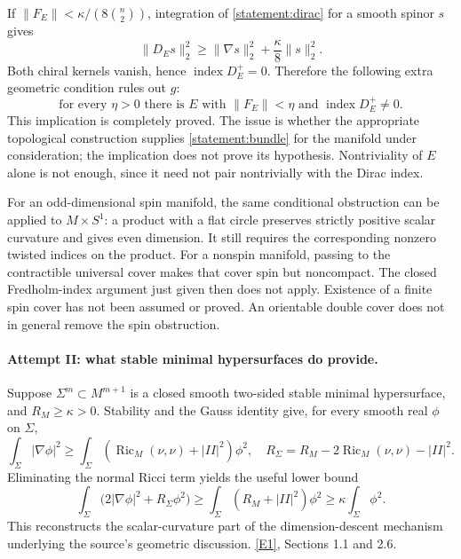 \documentclass[11pt,a4paper]{article}
\newcommand{\eref}[2]{\hyperlink{extra:#1:#2}{[E#2]}}
\numberwithin{equation}{section}
\begin{document}
If $\|F_E\|<\kappa/(8\binom n2)$, integration of
\eqref{statement:dirac} for a smooth spinor $s$ gives
\[
 \|D_Es\|_2^2\geq\|\nabla s\|_2^2+\frac\kappa8\|s\|_2^2.
\]
Both chiral kernels vanish, hence $\operatorname{index}D_E^+=0$.
Therefore the following extra geometric condition rules out $g$:
\begin{equation}\label{statement:bundle}
 \text{for every $\eta>0$ there is $E$ with }
 \|F_E\|<\eta\text{ and }\operatorname{index}D_E^+\ne0.
\end{equation}
This implication is completely proved.  The issue is whether the
appropriate topological construction supplies \eqref{statement:bundle} for
the manifold under consideration; the implication does not prove its
hypothesis.  Nontriviality of $E$ alone is not enough, since it need not
pair nontrivially with the Dirac index.

For an odd-dimensional spin manifold, the same conditional obstruction
can be applied to $M\times S^1$: a product with a flat circle preserves
strictly positive scalar curvature and gives even dimension.  It still
requires the corresponding nonzero twisted indices on the product.
For a nonspin manifold, passing to the contractible universal cover
makes that cover spin but noncompact.  The closed Fredholm-index
argument just given then does not apply.  Existence of a finite spin
cover has not been assumed or proved.  An orientable double cover does
not in general remove the spin obstruction.

\paragraph{Attempt II: what stable minimal hypersurfaces do provide.}
Suppose $\Sigma^m\subset M^{m+1}$ is a closed smooth two-sided stable
minimal hypersurface, and $R_M\geq\kappa>0$.  Stability and the Gauss
identity give, for every smooth real $\phi$ on $\Sigma$,
\[
 \int_\Sigma|\nabla\phi|^2\geq
 \int_\Sigma(\operatorname{Ric}_M(\nu,\nu)+|II|^2)\phi^2,
 \quad
 R_\Sigma=R_M-2\operatorname{Ric}_M(\nu,\nu)-|II|^2.
\]
Eliminating the normal Ricci term yields the useful lower bound
\begin{equation}\label{statement:stable}
 \int_\Sigma\bigl(2|\nabla\phi|^2+R_\Sigma\phi^2\bigr)
 \geq\int_\Sigma(R_M+|II|^2)\phi^2
 \geq\kappa\int_\Sigma\phi^2.
\end{equation}
This reconstructs the scalar-curvature part of the dimension-descent
mechanism underlying the source's geometric discussion.
\eref{statement}{1}, Sections 1.1 and 2.6.
\end{document}
